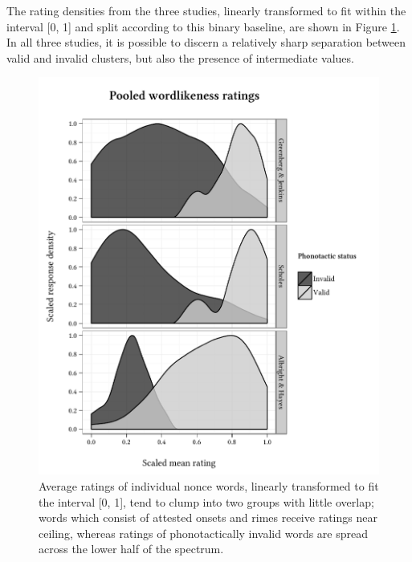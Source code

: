 The rating densities from the three studies, linearly transformed to fit within the interval [0, 1] and split according to this binary baseline, are shown in Figure \ref{dsn}. In all three studies, it is possible to discern a relatively sharp separation between valid and invalid clusters, but also the presence of intermediate values.

\begin{figure} \centering
\includegraphics{density.pdf}
\caption{Average ratings of individual nonce words, linearly transformed to fit the interval [0, 1], tend to clump into two groups with little overlap; words which consist of  attested onsets and rimes receive ratings near ceiling, whereas ratings of phonotactically invalid words are spread across the lower half of the spectrum.}
\label{dsn}
\end{figure}


